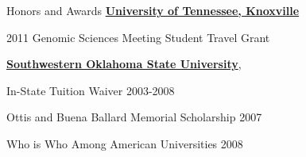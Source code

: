 \documentclass{resume} %
\begin{document}
\begin{rSection}{Honors and Awards}
\href{http://www.utk.edu}{\textbf{University of Tennessee, Knoxville}}
\item 2011 Genomic Sciences Meeting Student Travel Grant

\item \href{http://www.swosu.edu}{\textbf{Southwestern Oklahoma State University}},
\item In-State Tuition Waiver 2003-2008
\item Ottis and Buena Ballard Memorial Scholarship 2007
\item Who is Who Among American Universities 2008
\end{rSection}

\end{document}
